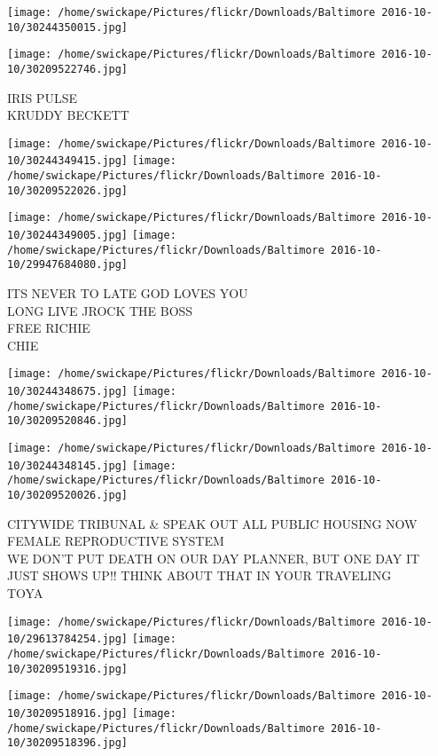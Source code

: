 \documentclass[10pt,letterpaper]{article}
\begin{document}
\texttt{[image: /home/swickape/Pictures/flickr/Downloads/Baltimore 2016-10-10/30244350015.jpg]}

\vspace{0.25in}
\texttt{[image: /home/swickape/Pictures/flickr/Downloads/Baltimore 2016-10-10/30209522746.jpg]}

IRIS PULSE\\
KRUDDY BECKETT\\
\pagebreak

\texttt{[image: /home/swickape/Pictures/flickr/Downloads/Baltimore 2016-10-10/30244349415.jpg]}
\texttt{[image: /home/swickape/Pictures/flickr/Downloads/Baltimore 2016-10-10/30209522026.jpg]}

\texttt{[image: /home/swickape/Pictures/flickr/Downloads/Baltimore 2016-10-10/30244349005.jpg]}
\texttt{[image: /home/swickape/Pictures/flickr/Downloads/Baltimore 2016-10-10/29947684080.jpg]}

ITS NEVER TO LATE GOD LOVES YOU\\
LONG LIVE JROCK THE BOSS\\
FREE RICHIE\\
CHIE\\
\pagebreak

\texttt{[image: /home/swickape/Pictures/flickr/Downloads/Baltimore 2016-10-10/30244348675.jpg]}
\texttt{[image: /home/swickape/Pictures/flickr/Downloads/Baltimore 2016-10-10/30209520846.jpg]}

\texttt{[image: /home/swickape/Pictures/flickr/Downloads/Baltimore 2016-10-10/30244348145.jpg]}
\texttt{[image: /home/swickape/Pictures/flickr/Downloads/Baltimore 2016-10-10/30209520026.jpg]}

CITYWIDE TRIBUNAL \& SPEAK OUT ALL PUBLIC HOUSING NOW\\
FEMALE REPRODUCTIVE SYSTEM\\
WE DON'T PUT DEATH ON OUR DAY PLANNER, BUT ONE DAY IT JUST SHOWS UP!! THINK ABOUT THAT IN YOUR TRAVELING\\
TOYA\\
\pagebreak

\texttt{[image: /home/swickape/Pictures/flickr/Downloads/Baltimore 2016-10-10/29613784254.jpg]}
\texttt{[image: /home/swickape/Pictures/flickr/Downloads/Baltimore 2016-10-10/30209519316.jpg]}

\texttt{[image: /home/swickape/Pictures/flickr/Downloads/Baltimore 2016-10-10/30209518916.jpg]}
\texttt{[image: /home/swickape/Pictures/flickr/Downloads/Baltimore 2016-10-10/30209518396.jpg]}
\end{document}
